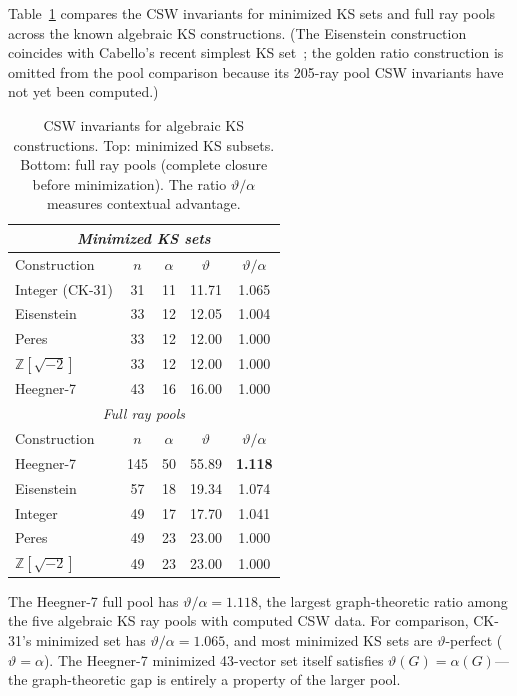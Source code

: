 \documentclass[twocolumn,prl,superscriptaddress,nofootinbib]{revtex4-2}
\newcommand{\Z}{\mathbb{Z}}
\begin{document}
Table~\ref{tab:csw} compares the CSW invariants for minimized KS sets and full ray pools across the known algebraic KS constructions. (The Eisenstein construction coincides with Cabello's recent simplest KS set~\cite{Cabello2025simplest}; the golden ratio construction is omitted from the pool comparison because its 205-ray pool CSW invariants have not yet been computed.)

\begin{table}[t]
\centering
\caption{CSW invariants for algebraic KS constructions. Top: minimized KS subsets. Bottom: full ray pools (complete closure before minimization). The ratio $\vartheta/\alpha$ measures contextual advantage.}
\label{tab:csw}
\begin{tabular}{lcccc}
\toprule
\multicolumn{5}{c}{\textit{Minimized KS sets}} \\
\midrule
Construction & $n$ & $\alpha$ & $\vartheta$ & $\vartheta/\alpha$ \\
\midrule
Integer (CK-31) & 31 & 11 & 11.71 & 1.065 \\
Eisenstein & 33 & 12 & 12.05 & 1.004 \\
Peres & 33 & 12 & 12.00 & 1.000 \\
$\Z[\sqrt{-2}]$ & 33 & 12 & 12.00 & 1.000 \\
Heegner-7 & 43 & 16 & 16.00 & 1.000 \\
\midrule
\multicolumn{5}{c}{\textit{Full ray pools}} \\
\midrule
Construction & $n$ & $\alpha$ & $\vartheta$ & $\vartheta/\alpha$ \\
\midrule
Heegner-7 & 145 & 50 & 55.89 & \textbf{1.118} \\
Eisenstein & 57 & 18 & 19.34 & 1.074 \\
Integer & 49 & 17 & 17.70 & 1.041 \\
Peres & 49 & 23 & 23.00 & 1.000 \\
$\Z[\sqrt{-2}]$ & 49 & 23 & 23.00 & 1.000 \\
\bottomrule
\end{tabular}
\end{table}

The Heegner-7 full pool has $\vartheta/\alpha = 1.118$, the largest graph-theoretic ratio among the five algebraic KS ray pools with computed CSW data.  For comparison, CK-31's minimized set has $\vartheta/\alpha = 1.065$, and most minimized KS sets are $\vartheta$-perfect ($\vartheta = \alpha$). The Heegner-7 minimized 43-vector set itself satisfies $\vartheta(G) = \alpha(G)$---the graph-theoretic gap is entirely a property of the larger pool.
\end{document}
